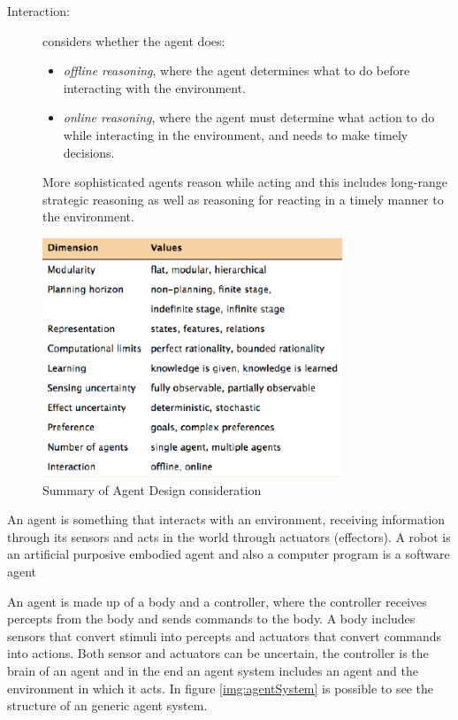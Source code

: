 \begin{description}
    \item [Interaction: ] considers whether the agent does:
                          \begin{itemize}
                            \item \emph{offline reasoning}, where the agent determines what to do before
                                  interacting with the environment.
                            \item \emph{online reasoning}, where the agent must determine what action to do 
                                  while interacting in the environment, and needs to make timely decisions.
                          \end{itemize}
                          More sophisticated agents reason while acting and this includes long-range
                          strategic reasoning as well as reasoning for reacting in a timely manner to
                          the environment.
\end{description}

\begin{figure}
    \includegraphics[width=0.8\textwidth]{Images/summary}
    \caption{Summary of Agent Design consideration}
    \label{img:summary}
\end{figure}

\begin{defi}
An agent is something that interacts with an environment, receiving information through its sensors and
acts in the world through actuators (effectors).\newline
A robot is an artificial purposive embodied agent and also a computer program is a software agent
\end{defi}
An agent is made up of a body and a controller, where the controller receives percepts from the body and
sends commands to the body.\newline
A body includes sensors that convert stimuli into percepts and actuators that convert commands into actions.
Both sensor and actuators can be uncertain, the controller is the brain of an agent and in the end
an agent system includes an agent and the environment in which it acts.\newline
In figure \ref{img:agentSystem} is possible to see the structure of an generic agent system.

